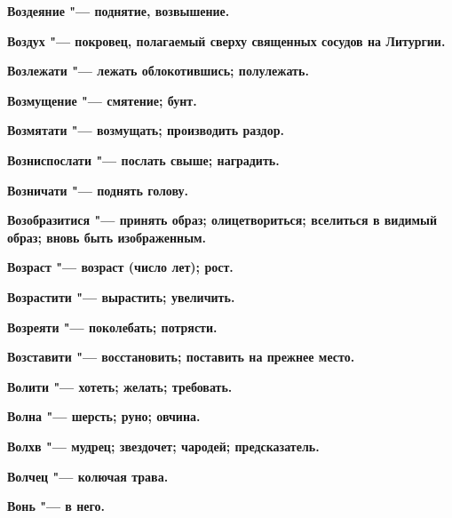 \bfseries Воздеяние \normalfont{} "--- поднятие, возвышение. 




\bfseries Воздух \normalfont{} "--- покровец, полагаемый сверху священных сосудов на Литургии. 




\bfseries Возлежати \normalfont{} "--- лежать облокотившись; полулежать. 




\bfseries Возмущение \normalfont{} "--- смятение; бунт. 




\bfseries Возмятати \normalfont{} "--- возмущать; производить раздор. 




\bfseries Возниспослати \normalfont{} "--- послать свыше; наградить. 




\bfseries Возничати \normalfont{} "--- поднять голову. 




\bfseries Возобразитися \normalfont{} "--- принять образ; олицетвориться; вселиться в видимый образ; вновь быть изображенным. 




\bfseries Возраст \normalfont{} "--- возраст (число лет); рост. 




\bfseries Возрастити \normalfont{} "--- вырастить; увеличить. 




\bfseries Возреяти \normalfont{} "--- поколебать; потрясти. 




\bfseries Возставити \normalfont{} "--- восстановить; поставить на прежнее место. 




\bfseries Волити \normalfont{} "--- хотеть; желать; требовать. 




\bfseries Волна \normalfont{} "--- шерсть; руно; овчина. 




\bfseries Волхв \normalfont{} "--- мудрец; звездочет; чародей; предсказатель. 




\bfseries Волчец \normalfont{} "--- колючая трава. 




\bfseries Вонь \normalfont{} "--- в него. 




